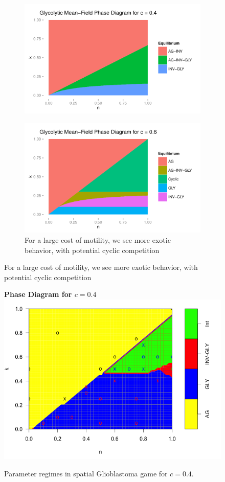 \documentclass[12pt]{report}
\begin{document}
\begin{figure}[H]
\centering
\begin{subfigure}[b]{0.8 \textwidth}
	\centering
	\includegraphics[width = 0.9 \textwidth]{Diagrams/basanta_phase-mf_c-0_4}
	\caption{}
\end{subfigure}

\begin{subfigure}[b]{0.8 \linewidth}
\centering
\includegraphics[width = 0.9 \linewidth]{Diagrams/basanta_phase-mf_c-0_6}
\caption{For a large cost of motility, we see more exotic behavior, with potential cyclic competition }
\end{subfigure}
\end{figure}

\begin{figure}[H]
\centering
\textbf{Phase Diagram for $c = 0.4$}
\includegraphics[width = 0.9 \linewidth]{Diagrams/b2_phase}
\caption{Parameter regimes in spatial Glioblastoma game for $c = 0.4$.}
\end{figure}
\end{document}
